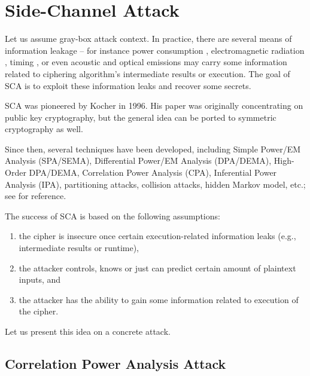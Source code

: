 \section{Side-Channel Attack}
\label{sec:side}

Let us assume gray-box attack context. In practice, there are several means of information leakage -- for instance power consumption \cite{kocher1999differential}, electromagnetic radiation \cite{agrawal2002side,gandolfi2001electromagnetic,quisquater2001electromagnetic}, timing \cite{kocher1996timing}, or even acoustic \cite{asonov2004keyboard} and optical \cite{kuhn2002optical,loughry2002information} emissions may carry some information related to ciphering algorithm's intermediate results or execution. The goal of SCA is to exploit these information leaks and recover some secrets.

SCA was pioneered by Kocher \cite{kocher1996timing} in 1996. His paper was originally concentrating on public key cryptography, but the general idea can be ported to symmetric cryptography as well.

Since then, several techniques have been developed, including Simple Power/EM Analysis (SPA/SEMA), Differential Power/EM Analysis (DPA/DEMA), High-Order DPA/DEMA, Correlation Power Analysis (CPA), Inferential Power Analysis (IPA), partitioning attacks, collision attacks, hidden Markov model, etc.; see \cite[Chapters~13-14]{koc2008cryptographic} for reference.

The success of SCA is based on the following assumptions:
\begin{enumerate}
	\item the cipher is insecure once certain execution-related information leaks (e.g., intermediate results or runtime),
	\item the attacker controls, knows or just can predict certain amount of plaintext inputs, and
	\item the attacker has the ability to gain some information related to execution of the cipher.
\end{enumerate}
Let us present this idea on a concrete attack.



\subsection{Correlation Power Analysis Attack}

